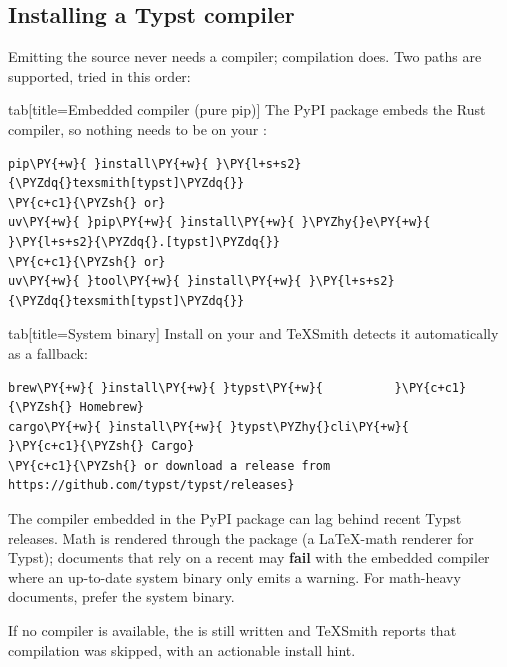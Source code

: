 \documentclass[a4paper,twoside]{article}
\begin{document}
\subsection{Installing a Typst compiler}
Emitting the  source never needs a compiler; compilation does. Two paths
are supported, tried in this order:
\begin{tsdiv}{tab}[title={Embedded compiler (pure pip)}]
The  PyPI package embeds the Rust compiler, so nothing needs to be
on your :
\begin{tscode}[lang=bash, engine=pygments]
\begin{Verbatim}[commandchars=\\\{\},breaklines, breakanywhere, commandchars=\\\{\}]
pip\PY{+w}{ }install\PY{+w}{ }\PY{l+s+s2}{\PYZdq{}texsmith[typst]\PYZdq{}}
\PY{c+c1}{\PYZsh{} or}
uv\PY{+w}{ }pip\PY{+w}{ }install\PY{+w}{ }\PYZhy{}e\PY{+w}{ }\PY{l+s+s2}{\PYZdq{}.[typst]\PYZdq{}}
\PY{c+c1}{\PYZsh{} or}
uv\PY{+w}{ }tool\PY{+w}{ }install\PY{+w}{ }\PY{l+s+s2}{\PYZdq{}texsmith[typst]\PYZdq{}}
\end{Verbatim}
\end{tscode}
\end{tsdiv}
\begin{tsdiv}{tab}[title={System binary}]
Install  on your  and TeXSmith detects it automatically as a
fallback:
\begin{tscode}[lang=bash, engine=pygments]
\begin{Verbatim}[commandchars=\\\{\},breaklines, breakanywhere, commandchars=\\\{\}]
brew\PY{+w}{ }install\PY{+w}{ }typst\PY{+w}{          }\PY{c+c1}{\PYZsh{} Homebrew}
cargo\PY{+w}{ }install\PY{+w}{ }typst\PYZhy{}cli\PY{+w}{      }\PY{c+c1}{\PYZsh{} Cargo}
\PY{c+c1}{\PYZsh{} or download a release from https://github.com/typst/typst/releases}
\end{Verbatim}
\end{tscode}
\end{tsdiv}
\begin{tscallout}[kind=warning, title={Prefer the system binary for recent math}]
The compiler embedded in the  PyPI package can lag behind recent
Typst releases. Math is rendered through the  package (a \LaTeX{}-math
renderer for Typst); documents that rely on a recent  may \textbf{fail}
with the embedded compiler where an up-to-date system binary only emits a
warning. For math-heavy documents, prefer the system binary.
\end{tscallout}
If no compiler is available, the  is still written and TeXSmith reports
that compilation was skipped, with an actionable install hint.
\end{document}
